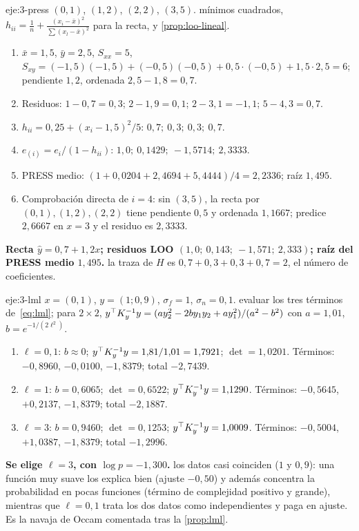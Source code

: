 \begin{solucion}{eje:3-press}
\datos $(0,1)$, $(1,2)$, $(2,2)$, $(3,5)$.
\planteamiento mínimos cuadrados, $h_{ii}=\frac1n+\frac{(x_i-\bar x)^2}{\sum(x_l-\bar x)^2}$ para la recta, y \cref{prop:loo-lineal}.
\pasos
\begin{enumerate}[label=\arabic*.]
  \item $\bar x=1{,}5$, $\bar y=2{,}5$, $S_{xx}=5$, $S_{xy}=(-1{,}5)(-1{,}5)+(-0{,}5)(-0{,}5)+0{,}5\cdot(-0{,}5)+1{,}5\cdot2{,}5=6$; pendiente $1{,}2$, ordenada $2{,}5-1{,}8=0{,}7$.
  \item Residuos: $1-0{,}7=0{,}3$; $2-1{,}9=0{,}1$; $2-3{,}1=-1{,}1$; $5-4{,}3=0{,}7$.
  \item $h_{ii}=0{,}25+(x_i-1{,}5)^2/5$: $0{,}7;\ 0{,}3;\ 0{,}3;\ 0{,}7$.
  \item $e_{(i)}=e_i/(1-h_{ii})$: $1{,}0;\ 0{,}1429;\ -1{,}5714;\ 2{,}3333$.
  \item PRESS medio: $(1+0{,}0204+2{,}4694+5{,}4444)/4=2{,}2336$; raíz $1{,}495$.
  \item Comprobación directa de $i=4$: sin $(3,5)$, la recta por $(0,1),(1,2),(2,2)$ tiene pendiente $0{,}5$ y ordenada $1{,}1667$; predice $2{,}6667$ en $x=3$ y el residuo es $2{,}3333$.
\end{enumerate}
\resultado \textbf{Recta $\hat y=0{,}7+1{,}2x$; residuos LOO $(1{,}0;\ 0{,}143;\ -1{,}571;\ 2{,}333)$; raíz del PRESS medio $1{,}495$.}
\comprobacion la traza de $H$ es $0{,}7+0{,}3+0{,}3+0{,}7=2$, el número de coeficientes.
\end{solucion}

\begin{solucion}{eje:3-lml}
\datos $x=(0,1)$, $y=(1;0{,}9)$, $\sigma_f=1$, $\sigma_n=0{,}1$.
\planteamiento evaluar los tres términos de~\eqref{eq:lml}; para $2\times2$, $y^\top K_{y}^{-1}y=(a y_2^2-2b y_1y_2+a y_1^2)/(a^2-b^2)$ con $a=1{,}01$, $b=e^{-1/(2\ell^2)}$.
\pasos
\begin{enumerate}[label=\arabic*.]
  \item $\ell=0{,}1$: $b\approx0$; $y^\top K_{y}^{-1}y=1{,}81/1{,}01=1{,}7921$; $\det=1{,}0201$. Términos: $-0{,}8960$, $-0{,}0100$, $-1{,}8379$; total $-2{,}7439$.
  \item $\ell=1$: $b=0{,}6065$; $\det=0{,}6522$; $y^\top K_{y}^{-1}y=1{,}1290$. Términos: $-0{,}5645$, $+0{,}2137$, $-1{,}8379$; total $-2{,}1887$.
  \item $\ell=3$: $b=0{,}9460$; $\det=0{,}1253$; $y^\top K_{y}^{-1}y=1{,}0009$. Términos: $-0{,}5004$, $+1{,}0387$, $-1{,}8379$; total $-1{,}2996$.
\end{enumerate}
\resultado \textbf{Se elige $\ell=3$, con $\log p=-1{,}300$.}
\comprobacion los datos casi coinciden ($1$ y $0{,}9$): una función muy suave los explica bien (ajuste $-0{,}50$) y además concentra la probabilidad en pocas funciones (término de complejidad positivo y grande), mientras que $\ell=0{,}1$ trata los dos datos como independientes y paga en ajuste. Es la navaja de Occam comentada tras la \cref{prop:lml}.
\end{solucion}

